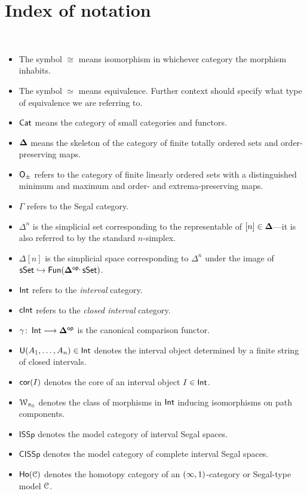 \documentclass{amsbook}
\begin{document}
\cleardoublepage
\tableofcontents

\cleardoublepage
\chapter*{Index of notation}\

\begin{itemize}
    \item The symbol $\cong$ means isomorphism in whichever category the morphism inhabits.
    \item The symbol $\simeq$ means equivalence. Further context should specify what type of equivalence we are referring to.
    \item $\operatorname{{\sf Cat}}$ means the category of small categories and functors.
    \item $\mathbf\Delta$ means the skeleton of the category of finite totally ordered sets and order-preserving maps.
    \item $\mathsf O_{\pm}$ refers to the category of finite linearly ordered sets with a distinguished minimum and maximum and order- and extrema-preserving maps.
    \item $\Gamma$ refers to the Segal category.
    \item $\Delta^{n}$ is the simplicial set corresponding to the representable of $[n]\in\mathbf\Delta$---it is also referred to by the standard $n$-simplex.
    \item $\Delta[n]$ is the simplicial space corresponding to $\Delta^n$ under the image of $\operatorname{\sf sSet}\hookrightarrow \operatorname{\sf Fun}(\mathbf\Delta^{\mathsf{op},}\operatorname{\sf sSet})$.
    \item $\operatorname{\mathsf{Int}}$ refers to the \emph{interval} category.
    \item $\operatorname{\mathsf{cInt}}$ refers to the \emph{closed interval} category.
    \item $\gamma\colon \operatorname{\mathsf{Int}} \longrightarrow \mathbf\Delta^{\mathsf{op}}$ is the canonical comparison functor.
    \item $\mathsf U(A_1,\ldots,A_n)\in \operatorname{\mathsf{Int}}$ denotes the interval object determined by a finite string of closed intervals.
    \item $\operatorname{{\sf cor}}(I)$ denotes the core of an interval object $I\in \operatorname{\mathsf{Int}}$.
    \item $\mathcal W_{\pi_0}$ denotes the class of morphisms in $\operatorname{\mathsf{Int}}$ inducing isomorphisms on path components.
    \item $\mathsf{ISSp}$ denotes the model category of interval Segal spaces.
    \item $\mathsf{CISSp}$ denotes the model category of complete interval Segal spaces.
    \item $\operatorname{\sf Ho}(\mathcal C)$ denotes the homotopy category of an $(\operatorname{\infty},1)$-category or Segal-type model $\mathcal C$.

\end{itemize}
\end{document}
